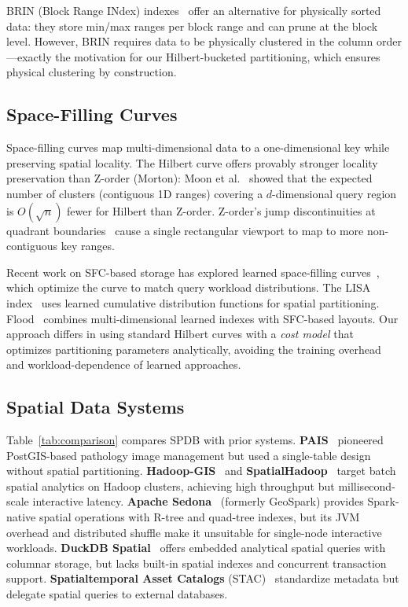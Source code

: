 \documentclass[sigconf]{acmart}
\begin{document}
BRIN (Block Range INdex) indexes~\cite{pg_brin} offer an alternative for physically sorted data: they store min/max ranges per block range and can prune at the block level.
However, BRIN requires data to be physically clustered in the column order---exactly the motivation for our Hilbert-bucketed partitioning, which ensures physical clustering by construction.

\subsection{Space-Filling Curves}

Space-filling curves map multi-dimensional data to a one-dimensional key while preserving spatial locality.
The Hilbert curve offers provably stronger locality preservation than Z-order (Morton): Moon et al.~\cite{moon2001analysis} showed that the expected number of clusters (contiguous 1D ranges) covering a $d$-dimensional query region is $O(\sqrt{n})$ fewer for Hilbert than Z-order.
Z-order's jump discontinuities at quadrant boundaries~\cite{kamel1994hilbert,lawder2000calculation} cause a single rectangular viewport to map to more non-contiguous key ranges.

Recent work on SFC-based storage has explored learned space-filling curves~\cite{qi2020effectively,nishimura2017md}, which optimize the curve to match query workload distributions.
The LISA index~\cite{li2020lisa} uses learned cumulative distribution functions for spatial partitioning.
Flood~\cite{nathan2020flood} combines multi-dimensional learned indexes with SFC-based layouts.
Our approach differs in using standard Hilbert curves with a \emph{cost model} that optimizes partitioning parameters analytically, avoiding the training overhead and workload-dependence of learned approaches.

\subsection{Spatial Data Systems}

Table~\ref{tab:comparison} compares SPDB with prior systems.
\textbf{PAIS}~\cite{wang2011pais} pioneered PostGIS-based pathology image management but used a single-table design without spatial partitioning.
\textbf{Hadoop-GIS}~\cite{aji2013hadoop} and \textbf{SpatialHadoop}~\cite{eldawy2015spatialhadoop} target batch spatial analytics on Hadoop clusters, achieving high throughput but millisecond-scale interactive latency.
\textbf{Apache Sedona}~\cite{sedona2021} (formerly GeoSpark) provides Spark-native spatial operations with R-tree and quad-tree indexes, but its JVM overhead and distributed shuffle make it unsuitable for single-node interactive workloads.
\textbf{DuckDB Spatial}~\cite{duckdb2019} offers embedded analytical spatial queries with columnar storage, but lacks built-in spatial indexes and concurrent transaction support.
\textbf{Spatialtemporal Asset Catalogs} (STAC)~\cite{stac2021} standardize metadata but delegate spatial queries to external databases.
\end{document}
